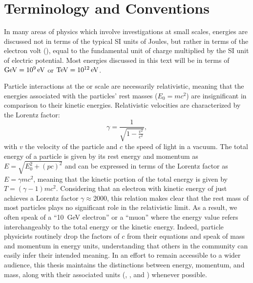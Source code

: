 \section{Terminology and Conventions}

In many areas of physics which involve investigations at small scales, energies are discussed not in terms of the typical SI units of Joules, but rather in terms of the electron volt (\eV), equal to the fundamental unit of charge multiplied by the SI unit of electric potential.  Most energies discussed in this text will be in terms of $\GeV = \SI{e9}{\eV}$ or $\TeV = \SI{e12}{\eV}$.

Particle interactions at the \GeV or \TeV scale are necessarily relativistic, meaning that the energies associated with the particles' rest masses ($E_0 = mc^2$) are insignificant in comparison to their kinetic energies.  Relativistic velocities are characterized by the Lorentz factor:
\begin{equation}
  \gamma = \frac{1}{\sqrt{1 - \frac{v^2}{c^2}}},
\end{equation}
with $v$ the velocity of the particle and $c$ the speed of light in a vacuum.  The total energy of a particle is given by its rest energy and momentum as $E = \sqrt{E_0^2 + (pc)^2}$ and can be expressed in terms of the Lorentz factor as $E = \gamma mc^2$, meaning that the kinetic portion of the total energy is given by $T = (\gamma - 1)mc^2$.
Considering that an electron with kinetic energy of just  achieves a Lorentz factor $\gamma \approx 2000$, this relation makes clear that the rest mass of most particles plays no significant role in the relativistic limit.  As a result, we often speak of a ``\SI{10}{\GeV} electron'' or a ``\TeV muon'' where the energy value refers interchangeably to the total energy or the kinetic energy.  Indeed, particle physicists routinely drop the factors of $c$ from their equations and speak of mass and momentum in energy units, understanding that others in the community can easily infer their intended meaning.  In an effort to remain accessible to a wider audience, this thesis  maintains the distinctions between energy, momentum, and mass, along with their associated units (\GeV, \GeVc, and \GeVcc) whenever possible.

